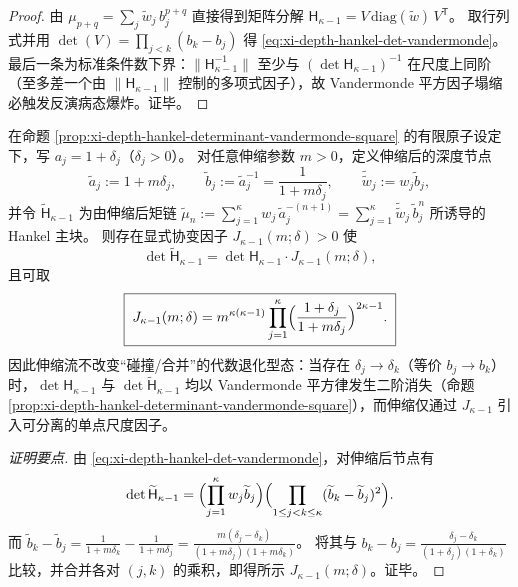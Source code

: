 \begin{proof}
由
\(
\mu_{p+q}=\sum_j \widetilde w_j\,b_j^{p+q}
\)
直接得到矩阵分解 \(\mathsf H_{\kappa-1}=V\,\mathrm{diag}(\widetilde w)\,V^{\mathsf T}\)。
取行列式并用 \(\det(V)=\prod_{j<k}(b_k-b_j)\) 得 \eqref{eq:xi-depth-hankel-det-vandermonde}。
最后一条为标准条件数下界：\(\|\mathsf H_{\kappa-1}^{-1}\|\) 至少与 \((\det\mathsf H_{\kappa-1})^{-1}\) 在尺度上同阶（至多差一个由 \(\|\mathsf H_{\kappa-1}\|\) 控制的多项式因子），故 Vandermonde 平方因子塌缩必触发反演病态爆炸。证毕。
\end{proof}

\begin{proposition}\label{prop:xi-hankel-det-scaling-covariance}
在命题 \ref{prop:xi-depth-hankel-determinant-vandermonde-square} 的有限原子设定下，写 \(a_j=1+\delta_j\)（\(\delta_j>0\)）。
对任意伸缩参数 \(m>0\)，定义伸缩后的深度节点
\[
\widetilde a_j:=1+m\delta_j,
\qquad
\widetilde b_j:=\widetilde a_j^{-1}=\frac{1}{1+m\delta_j},
\qquad
\widetilde{\widetilde w}_j:=w_j\widetilde b_j,
\]
并令 \(\widetilde{\mathsf H}_{\kappa-1}\) 为由伸缩后矩链
\(
\widetilde\mu_n:=\sum_{j=1}^{\kappa}w_j\,\widetilde a_j^{-(n+1)}
=\sum_{j=1}^{\kappa}\widetilde{\widetilde w}_j\,\widetilde b_j^{n}
\)
所诱导的 Hankel 主块。
则存在显式协变因子 \(J_{\kappa-1}(m;\delta)>0\) 使
\[
\boxed{\;
\det \widetilde{\mathsf H}_{\kappa-1}
=\det \mathsf H_{\kappa-1}\cdot J_{\kappa-1}(m;\delta),\;}
\]
且可取
\[
\boxed{\;
J_{\kappa-1}(m;\delta)
=m^{\kappa(\kappa-1)}
\prod_{j=1}^{\kappa}\Bigl(\frac{1+\delta_j}{1+m\delta_j}\Bigr)^{2\kappa-1}.\;}
\]
因此伸缩流不改变“碰撞/合并”的代数退化型态：当存在 \(\delta_j\to\delta_k\)（等价 \(b_j\to b_k\)）时，\(\det \mathsf H_{\kappa-1}\) 与 \(\det\widetilde{\mathsf H}_{\kappa-1}\) 均以 Vandermonde 平方律发生二阶消失（命题 \ref{prop:xi-depth-hankel-determinant-vandermonde-square}），而伸缩仅通过 \(J_{\kappa-1}\) 引入可分离的单点尺度因子。
\end{proposition}
\begin{proof}[证明要点]
由 \eqref{eq:xi-depth-hankel-det-vandermonde}，对伸缩后节点有
\[
\det \widetilde{\mathsf H}_{\kappa-1}
=\Bigl(\prod_{j=1}^{\kappa}w_j\widetilde b_j\Bigr)\Bigl(\prod_{1\le j<k\le\kappa}(\widetilde b_k-\widetilde b_j)^2\Bigr).
\]
而
\(
\widetilde b_k-\widetilde b_j=\frac{1}{1+m\delta_k}-\frac{1}{1+m\delta_j}
=\frac{m(\delta_j-\delta_k)}{(1+m\delta_j)(1+m\delta_k)}
\)。
将其与 \(b_k-b_j=\frac{\delta_j-\delta_k}{(1+\delta_j)(1+\delta_k)}\) 比较，并合并各对 \((j,k)\) 的乘积，即得所示 \(J_{\kappa-1}(m;\delta)\)。证毕。
\end{proof}

